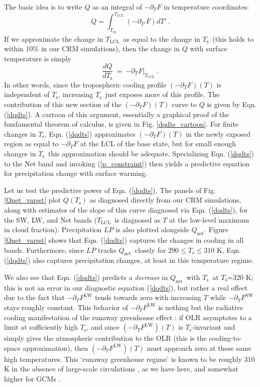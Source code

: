 \documentclass[9pt,twocolumn,twoside,lineno]{pnas-new}
\newcommand{\beqn}{\begin{equation}}
\newcommand{\eeqn}{\end{equation}}
\newcommand{\eqnref}[1]{(\ref{#1})}
\newcommand{\n}{\nonumber}
\newcommand{\der}[2]{\ensuremath{\frac{d #1}{d #2}}}
\newcommand{\ppt}{\ensuremath{\partial_T}}
\newcommand{\Qnet}{\ensuremath{Q_\mathrm{net}}}
\newcommand{\FLW}{\ensuremath{F^\mathrm{LW}}}
\newcommand{\FSW}{\ensuremath{F^\mathrm{SW}}}
\newcommand{\Ts}{\ensuremath{T_\mathrm{s}}}
\newcommand{\Tlcl}{\ensuremath{T_\mathrm{LCL}}}
\newcommand{\Ttp}{\ensuremath{T_\mathrm{tp}}}
\begin{document}
	  The basic idea is to write $Q$ as an integral of $-\ppt F$  in temperature coordinates: 
	\beqn
		Q =  \int_{\Ttp}^{\Tlcl} (-\partial_{T'} F) dT' \ . 
		\n
	\eeqn
   If we approximate the change in  \Tlcl\ as equal to the change in \Ts\ (this holds to within 10\% in our CRM simulations), then the change in $Q$ with surface temperature is  simply
	\beqn
		\der{Q}{\Ts} \ =\  \left.  -\ppt F\right|_{\Tlcl}  \; .
	\label{dqdts}
	\eeqn
In other words, since the tropospheric cooling profile $(-\ppt F)(T)$  is independent of \Ts, increasing \Ts\ just exposes more of this profile.  The contribution of this new section of the $(-\ppt F)(T)$ curve to $Q$ is given by Eqn. \eqnref{dqdts}.  A cartoon of this argument, essentially a graphical proof of the fundamental theorem of calculus, is given in Fig. \ref{dqdts_cartoon}. For finite changes in \Ts, Eqn. \eqnref{dqdts} approximates $(-\ppt F)(T)$ in the newly exposed region as equal to $-\ppt F$ at the LCL of the base state, but for small enough changes in \Ts\ this approximation should be adequate. Specializing Eqn. \eqnref{dqdts} to the Net band and invoking \eqnref{p_constraint} then yields a predictive  equation for precipitation change with surface warming.



Let us test the predictive power of Eqn. \eqnref{dqdts}. The panels of Fig. \ref{Qnet_varsst} plot $Q(\Ts)$ as diagnosed directly from our CRM simulations, along with estimates of the slope of this curve diagnosed via  Eqn. \eqnref{dqdts}, for the SW, LW, and Net  bands (\Tlcl\ is diagnosed as $T$ at the low-level maximum in cloud fraction). Precipitation $LP$ is also plotted alongside $\Qnet$.  Figure \ref{Qnet_varsst} shows that  Eqn. \eqnref{dqdts}  captures the changes in  cooling in all bands. Furthermore, since $LP$ tracks \Qnet\ closely for $290\leq \Ts \leq 310$ K, Eqn. \eqnref{dqdts} also captures precipitation changes, at least in this temperature regime.

We also see that  Eqn. \eqnref{dqdts} predicts a \emph{decrease} in  \Qnet\ with \Ts\ at \Ts=320 K; this is not an error in our diagnostic equation \eqnref{dqdts}, but rather a real effect due to the fact that $-\ppt \FLW$ tends towards zero with increasing $T$  while $-\ppt \FSW$ stays roughly constant. This behavior of $-\ppt \FLW$ is nothing but the radiative cooling manifestation of the runaway greenhouse effect \citep{pierrehumbert2010}: if OLR asymptotes to a limit at sufficiently high \Ts, and since $(-\ppt \FLW)(T)$ is \Ts-invariant and simply gives the atmospheric contribution to the OLR (this is the cooling-to-space approximation), then $(-\ppt \FLW)(T)$ must approach zero at these same high temperatures. This `runaway greenhouse regime' is known to be roughly 310 K in the absence of large-scale circulations \citep{goldblatt2013}, as we have here, and somewhat higher for GCMs \citep{wolf2014,leconte2013}. 
\end{document}
